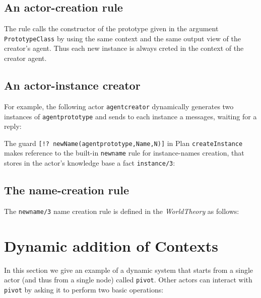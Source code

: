\subsection{An actor-creation rule}


The rule calls the constructor of the prototype given in the argument \texttt{PrototypeClass} by using the same context and the same output view of the creator's agent. Thus each new instance is always creted in the context of the creator agent.

\subsection{An actor-instance creator}
For example, the following actor \texttt{agentcreator} dynamically generates two instances of \texttt{agentprototype} and sends to each instance a messages, waiting for a reply:




The guard 
\texttt{[!? newName(agentprototype,Name,N)]} 
in Plan \texttt{createInstance} makes reference to the built-in \texttt{newname} rule for instance-names creation, that stores in the actor's knowledge base a fact \texttt{instance/3}:




\subsection{The name-creation rule}
The \texttt{newname/3} name creation rule is defined in the \textit{WorldTheory} as follows:



\section{Dynamic addition of Contexts}

In this section we give an example of a dynamic system that starts from a single actor (and thus from a single node) called \texttt{pivot}. Other actors can interact with \texttt{pivot} by asking it to perform two basic operations:

